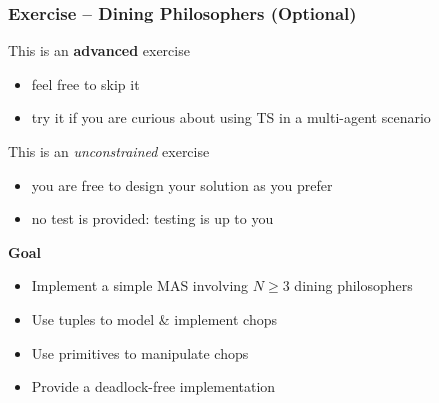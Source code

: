 \documentclass[presentation]{beamer}\mode<presentation>{\usetheme{AMSCesenaPurpleAndGold}}
\begin{document}
\begin{frame}[allowframebreaks]
	\frametitle{Exercise \currentExercise{} -- Dining Philosophers (Optional)}
	
	\begin{alertblock}{This is an \textbf{advanced} exercise}
		\begin{itemize}
			\item feel free to skip it
			\item try it if you are curious about using TS in a \alert{multi-}agent scenario
		\end{itemize}
	\end{alertblock}
	
	\bigskip
	
	\begin{alertblock}{This is an \emph{unconstrained} exercise}
		\begin{itemize}
			\item you are free to design your solution as you prefer
			\item no test is provided: testing is up to you
		\end{itemize}
	\end{alertblock}
	
	\bigskip
	
	\begin{block}{\textbf{Goal}}
		\begin{itemize}
			\item Implement a simple MAS involving $N \geq 3$ \alert{dining philosophers}
			\item Use \linda{} tuples to model \& implement chops
			\item Use \linda{} primitives to manipulate chops
			\item Provide a \alert{deadlock-free} implementation
		\end{itemize}
	\end{block}
	
\end{frame}

\section*{}

\frame{\titlepage}
\end{document}
